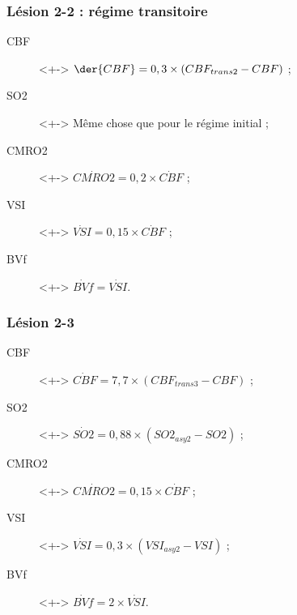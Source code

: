 \begin{frame}
\frametitle{L\'esion 2-2 : r\'egime transitoire}
\begin{description}
\item[CBF]<+-> $\der{CBF}=0,3\times \left(CBF_{trans2}-CBF\right)$ ;
\item[SO2]<+-> M\^eme chose que pour le r\'egime initial ;
\item[CMRO2]<+-> $\dot{CMRO2}=0,2\times\dot{CBF}$ ;
\item[VSI]<+-> $\dot{VSI}=0,15\times\dot{CBF}$ ;
\item[BVf]<+-> $\dot{BVf}=\dot{VSI}$.
\end{description}
\end{frame}

\begin{frame}
\frametitle{L\'esion 2-3}
\begin{description}
\item[CBF]<+-> $\dot{CBF}=7,7\times\left(CBF_{trans3}-CBF\right)$ ;
\item[SO2]<+-> $\dot{SO2}=0,88\times\left(SO2_{asy2}-SO2\right)$ ;
\item[CMRO2]<+-> $\dot{CMRO2}=0,15\times\dot{CBF}$ ;
\item[VSI]<+-> $\dot{VSI}=0,3\times (VSI_{asy2}-VSI)$ ;
\item[BVf]<+-> $\dot{BVf}=2\times\dot{VSI}$.
\end{description}
\end{frame}